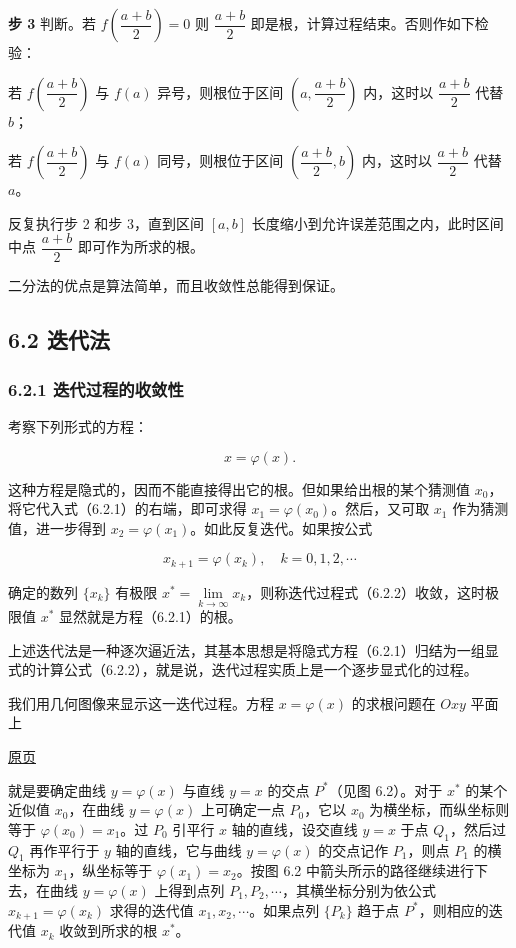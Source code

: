 \documentclass[
  10pt,
  fontset=fandol]{ctexart}
\begin{document}
\textbf{步 3} 判断。若 \(f\left(\dfrac{a+b}{2}\right)=0\) 则 \(\dfrac{a+b}{2}\) 即是根，计算过程结束。否则作如下检验：

若 \(f\left(\dfrac{a+b}{2}\right)\) 与 \(f(a)\) 异号，则根位于区间 \(\left(a,\dfrac{a+b}{2}\right)\) 内，这时以 \(\dfrac{a+b}{2}\) 代替 \(b\)；

若 \(f\left(\dfrac{a+b}{2}\right)\) 与 \(f(a)\) 同号，则根位于区间 \(\left(\dfrac{a+b}{2},b\right)\) 内，这时以 \(\dfrac{a+b}{2}\) 代替 \(a\)。

反复执行步 2 和步 3，直到区间 \([a,b]\) 长度缩小到允许误差范围之内，此时区间中点 \(\dfrac{a+b}{2}\) 即可作为所求的根。

二分法的优点是算法简单，而且收敛性总能得到保证。

\subsection{6.2 迭代法}\label{ux8fedux4ee3ux6cd5}

\subsubsection{6.2.1 迭代过程的收敛性}\label{ux8fedux4ee3ux8fc7ux7a0bux7684ux6536ux655bux6027}

考察下列形式的方程：

\[
x=\varphi(x).
\tag{6.2.1}
\]

这种方程是隐式的，因而不能直接得出它的根。但如果给出根的某个猜测值 \(x_0\)，将它代入式（6.2.1）的右端，即可求得 \(x_1=\varphi(x_0)\)。然后，又可取 \(x_1\) 作为猜测值，进一步得到 \(x_2=\varphi(x_1)\)。如此反复迭代。如果按公式

\[
x_{k+1}=\varphi(x_k),\quad k=0,1,2,\cdots
\tag{6.2.2}
\]

确定的数列 \(\{x_k\}\) 有极限 \(x^*=\lim\limits_{k\to\infty}x_k\)，则称迭代过程式（6.2.2）收敛，这时极限值 \(x^*\) 显然就是方程（6.2.1）的根。

上述迭代法是一种逐次逼近法，其基本思想是将隐式方程（6.2.1）归结为一组显式的计算公式（6.2.2），就是说，迭代过程实质上是一个逐步显式化的过程。

我们用几何图像来显示这一迭代过程。方程 \(x=\varphi(x)\) 的求根问题在 \(Oxy\) 平面上

\href{../../source-images/pdf-158.jpeg}{原页}

就是要确定曲线 \(y=\varphi(x)\) 与直线 \(y=x\) 的交点 \(P^*\)（见图 6.2）。对于 \(x^*\) 的某个近似值 \(x_0\)，在曲线 \(y=\varphi(x)\) 上可确定一点 \(P_0\)，它以 \(x_0\) 为横坐标，而纵坐标则等于 \(\varphi(x_0)=x_1\)。过 \(P_0\) 引平行 \(x\) 轴的直线，设交直线 \(y=x\) 于点 \(Q_1\)，然后过 \(Q_1\) 再作平行于 \(y\) 轴的直线，它与曲线 \(y=\varphi(x)\) 的交点记作 \(P_1\)，则点 \(P_1\) 的横坐标为 \(x_1\)，纵坐标等于 \(\varphi(x_1)=x_2\)。按图 6.2 中箭头所示的路径继续进行下去，在曲线 \(y=\varphi(x)\) 上得到点列 \(P_1,P_2,\cdots\)，其横坐标分别为依公式 \(x_{k+1}=\varphi(x_k)\) 求得的迭代值 \(x_1,x_2,\cdots\)。如果点列 \(\{P_k\}\) 趋于点 \(P^*\)，则相应的迭代值 \(x_k\) 收敛到所求的根 \(x^*\)。
\end{document}
